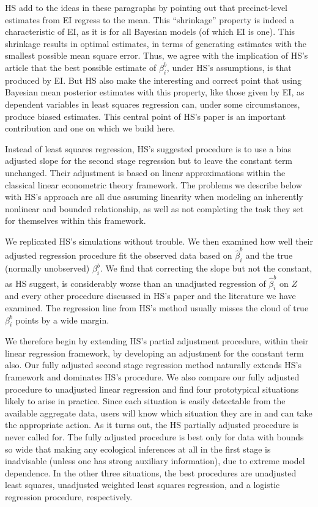 \documentclass[11pt,titlepage]{article}
\begin{document}
HS add to the ideas in these paragraphs by pointing out that
precinct-level estimates from EI regress to the mean.  This
``shrinkage'' property is indeed a characteristic of EI, as it is for
all Bayesian models (of which EI is one).  This shrinkage results in
optimal estimates, in terms of generating estimates with the smallest
possible mean square error.  Thus, we agree with the implication of
HS's article that the best possible estimate of $\beta^b_i$, under
HS's assumptions, is that produced by EI.  But HS also make the
interesting and correct point that using Bayesian mean posterior
estimates with this property, like those given by EI, as dependent
variables in least squares regression can, under some circumstances,
produce biased estimates.  This central point of HS's paper is an
important contribution and one on which we build here.

Instead of least squares regression, HS's suggested procedure is to
use a bias adjusted slope for the second stage regression but to leave
the constant term unchanged.  Their adjustment is based on linear
approximations within the classical linear econometric theory
framework.  The problems we describe below with HS's approach are all
due assuming linearity when modeling an inherently nonlinear and
bounded relationship, as well as not completing the task they set for
themselves within this framework.

We replicated HS's simulations without trouble.  We then examined how
well their adjusted regression procedure fit the observed data based
on $\hat\beta_i^b$ and the true (normally unobserved) $\beta_i^b$.  We
find that correcting the slope but not the constant, as HS suggest, is
considerably worse than an unadjusted regression of $\hat\beta_i^b$ on
$Z$ and every other procedure discussed in HS's paper and the
literature we have examined.  The regression line from HS's method
usually misses the cloud of true $\beta_i^b$ points by a wide margin.

We therefore begin by extending HS's partial adjustment procedure,
within their linear regression framework, by developing an adjustment
for the constant term also.  Our fully adjusted second stage
regression method naturally extends HS's framework and dominates HS's
procedure.  We also compare our fully adjusted procedure to unadjusted
linear regression and find four prototypical situations likely to
arise in practice.  Since each situation is easily detectable from the
available aggregate data, users will know which situation they are in
and can take the appropriate action.  As it turns out, the HS
partially adjusted procedure is never called for.  The fully adjusted
procedure is best only for data with bounds so wide that making any
ecological inferences at all in the first stage is inadvisable (unless
one has strong auxiliary information), due to extreme model
dependence.  In the other three situations, the best procedures are
unadjusted least squares, unadjusted weighted least squares
regression, and a logistic regression procedure, respectively.
\end{document}
